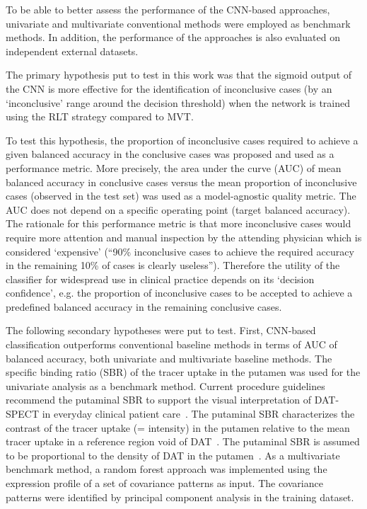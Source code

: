 To be able to better assess the performance of the CNN-based approaches, univariate and multivariate conventional methods were employed as 
benchmark methods. In addition, the performance of the approaches is also evaluated on independent external datasets.


The primary hypothesis put to test in this work was that the sigmoid output of the CNN is more effective for the identification of inconclusive cases 
(by an `inconclusive' range around the decision threshold) when the network is trained using the RLT strategy compared to MVT.

To test this hypothesis, the proportion of inconclusive cases required to achieve a given balanced accuracy in the conclusive cases 
was proposed and used as a performance metric.
More precisely, the area under the curve (AUC) of mean balanced accuracy in conclusive cases versus the mean proportion of inconclusive cases 
(observed in the test set) was used as a model-agnostic quality metric. 
The AUC does not depend on a specific operating point (target balanced accuracy).  
The rationale for this performance metric is that more inconclusive cases would require more attention and manual inspection 
by the attending physician which is considered `expensive'
(“90\% inconclusive cases to achieve the required accuracy in the remaining 10\% of cases is clearly useless”).
Therefore the utility of the classifier for widespread use in clinical practice depends on its `decision confidence', 
e.g. the proportion of inconclusive cases to be accepted to achieve a predefined balanced accuracy in the remaining conclusive cases. 

The following secondary hypotheses were put to test. 
First, CNN-based classification outperforms conventional baseline methods in terms of AUC of balanced accuracy, 
both univariate and multivariate baseline methods. 
The specific binding ratio (SBR) of the tracer uptake in the putamen was used for the univariate analysis as a benchmark method.
Current procedure guidelines recommend the putaminal SBR to support the visual interpretation of DAT-SPECT in everyday clinical patient care~\citep{Morbelli2020}.
The putaminal SBR characterizes the contrast of the tracer uptake (= intensity) in the putamen relative to the mean tracer uptake in a reference 
region void of DAT~\citep{Buchert2019}.
The putaminal SBR is assumed to be proportional to the density of DAT in the putamen~\citep{Buchert2019}. 
As a multivariate benchmark method, a random forest approach was implemented using the expression profile of a set of covariance patterns as input. 
The covariance patterns were identified by principal component analysis in the training dataset. 

